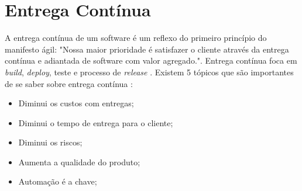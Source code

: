 \section{Entrega Contínua}

A entrega contínua de um software é um reflexo do primeiro princípio do manifesto ágil: "Nossa maior prioridade é satisfazer o cliente através da entrega contínua e adiantada de software com valor agregado."\cite{manifesto}. Entrega contínua foca em \textit{build}, \textit{deploy}, teste e processo de \textit{release} \cite{livro-deploy-continuo}.
Existem 5 tópicos que são importantes de se saber sobre entrega contínua \cite{network-world}:
\begin{itemize}
    \item Diminui os custos com entregas;
    \item Diminui o tempo de entrega para o cliente;
    \item Diminui os riscos;
    \item Aumenta a qualidade do produto;
    \item Automação é a chave;
\end{itemize}
